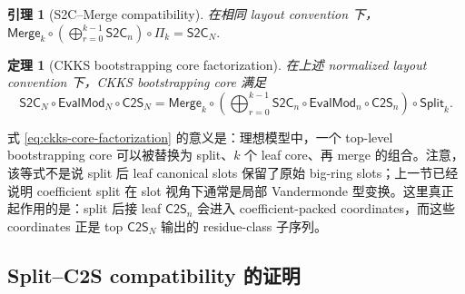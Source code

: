 \documentclass[UTF8,11pt]{article}
\newcommand{\Split}{\mathsf{Split}}
\newcommand{\Merge}{\mathsf{Merge}}
\newcommand{\CtwoS}{\mathsf{C2S}}
\newcommand{\StwoC}{\mathsf{S2C}}
\newcommand{\EvalMod}{\mathsf{EvalMod}}
\theoremstyle{definition}
\theoremstyle{plain}
\newtheorem{lemma}{引理}
\newtheorem{theorem}{定理}
\begin{document}
\begin{lemma}[S2C--Merge compatibility]
\label{lem:s2c-merge}
在相同 layout convention 下，
\(\Merge_k\circ\left(\bigoplus_{r=0}^{k-1}\StwoC_n\right)\circ\Pi_k=\StwoC_N.\)
\end{lemma}

\begin{theorem}[CKKS bootstrapping core factorization]
\label{thm:ckks-core-factorization}
在上述 normalized layout convention 下，CKKS bootstrapping core 满足
\begin{equation}
\label{eq:ckks-core-factorization}
\StwoC_N\circ\EvalMod_N\circ\CtwoS_N
=
\Merge_k\circ
\left(
\bigoplus_{r=0}^{k-1}
\StwoC_n\circ\EvalMod_n\circ\CtwoS_n
\right)
\circ\Split_k.
\end{equation}
\end{theorem}

式 \eqref{eq:ckks-core-factorization} 的意义是：理想模型中，一个 top-level bootstrapping core 可以被替换为 split、\(k\) 个 leaf core、再 merge 的组合。注意，该等式不是说 split 后 leaf canonical slots 保留了原始 big-ring slots；上一节已经说明 coefficient split 在 slot 视角下通常是局部 Vandermonde 型变换。这里真正起作用的是：split 后接 leaf \(\CtwoS_n\) 会进入 coefficient-packed coordinates，而这些 coordinates 正是 top \(\CtwoS_N\) 输出的 residue-class 子序列。

\subsection{Split--C2S compatibility 的证明}
\label{subsec:proof-split-c2s}
\end{document}
